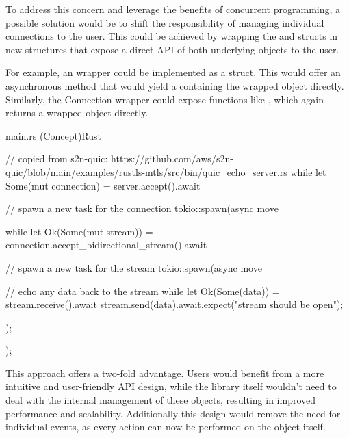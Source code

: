 To address this concern and leverage the benefits of concurrent programming, a possible solution would be to shift the responsibility
of managing individual connections to the user. This could be achieved by wrapping the  and 
structs in new structures that expose a direct API of both underlying objects to the user.

For example, an  wrapper could be implemented as a  struct. This  would offer
an asynchronous  method that would yield a  containing the wrapped 
object directly. Similarly, the Connection wrapper could expose functions like , which again returns
a wrapped  object directly.

\begin{codeblock}{main.rs (Concept)}{Rust}
    \begin{rustcode}
        // copied from s2n-quic: https://github.com/aws/s2n-quic/blob/main/examples/rustls-mtls/src/bin/quic_echo_server.rs
        while let Some(mut connection) = server.accept().await {
            // spawn a new task for the connection
            tokio::spawn(async move {

                while let Ok(Some(mut stream)) = connection.accept_bidirectional_stream().await {
                    // spawn a new task for the stream
                    tokio::spawn(async move {

                        // echo any data back to the stream
                        while let Ok(Some(data)) = stream.receive().await {
                            stream.send(data).await.expect("stream should be open");
                        }
                    });
                }
            });
        }
    \end{rustcode}
    \label{example_lib_redesign}
\end{codeblock}

This approach offers a two-fold advantage. Users would benefit from a more intuitive and user-friendly API design, while the library
itself wouldn't need to deal with the internal management of these objects, resulting in improved performance and scalability.
Additionally this design would remove the need for individual events, as every action can now be performed on the object itself.
